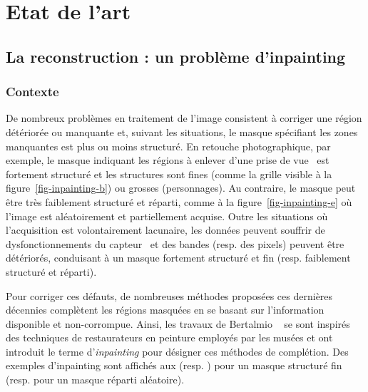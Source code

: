 \chapter{Etat de l'art}
\dochaptoc
\label{ch-chapter_2}

%
\section{La reconstruction : un problème d'inpainting}

\subsection{Contexte}


De nombreux problèmes en traitement de l'image consistent à corriger une région détériorée ou manquante et, suivant les situations, le masque spécifiant les zones manquantes est plus ou moins structuré. En retouche photographique, par exemple, le masque indiquant les régions à enlever d'une prise de vue~\cite{criminisi2004region} est fortement structuré et les structures sont fines (comme la grille visible à la figure~\ref{fig-inpainting-b}) ou grosses (personnages). Au contraire, le masque peut être très faiblement structuré et réparti, comme à la figure~\ref{fig-inpainting-e} où l'image est aléatoirement et partiellement acquise. Outre les situations où l'acquisition est volontairement lacunaire, les données peuvent souffrir de dysfonctionnements du capteur~\cite{zhang2013hyperspectral} et des bandes (resp. des pixels) peuvent être détériorés, conduisant à un masque fortement structuré et fin (resp. faiblement structuré et réparti).

Pour corriger ces défauts, de nombreuses méthodes proposées ces dernières décennies complètent les régions masquées en se basant sur l'information disponible et non-corrompue. Ainsi, les travaux de Bertalmio \etal{}~\cite{bertalmio2000image} se sont inspirés des techniques de restaurateurs en peinture employés par les musées et ont introduit le terme d'\emph{inpainting} pour désigner ces méthodes de complétion. Des exemples d'inpainting sont affichés aux  (resp. ) pour un masque structuré fin (resp. pour un masque réparti aléatoire). 

